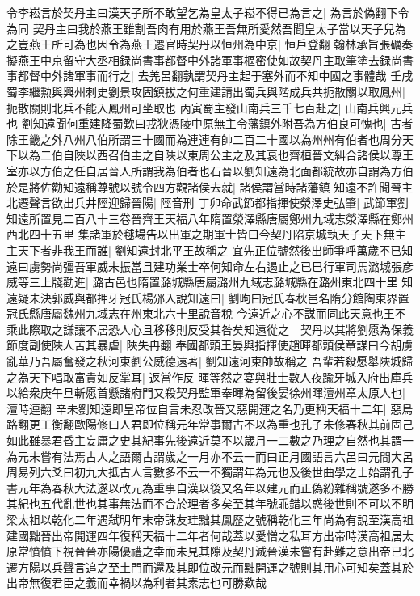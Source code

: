 令李崧言於契丹主曰漢天子所不敢望乞為皇太子崧不得已為言之|{
	為言於偽翻下令為同}
契丹主曰我於燕王雖割吾肉有用於燕王吾無所愛然吾聞皇太子當以天子兒為之豈燕王所可為也因令為燕王遷官時契丹以恒州為中京|{
	恒戶登翻}
翰林承旨張礪奏擬燕王中京留守大丞相録尚書事都督中外諸軍事樞密使如故契丹主取筆塗去録尚書事都督中外諸軍事而行之|{
	去羌呂翻孰謂契丹主起于塞外而不知中國之事體哉}
壬戌蜀李繼勲與興州刺史劉景攻固鎮拔之何重建請出蜀兵與階成兵共扼散關以取鳳州|{
	扼散關則北兵不能入鳳州可坐取也}
丙寅蜀主發山南兵三千七百赴之|{
	山南兵興元兵也}
劉知遠聞何重建降蜀歎曰戎狄憑陵中原無主令藩鎮外附吾為方伯良可愧也|{
	古者除王畿之外八州八伯所謂三十國而為連連有帥二百二十國以為州州有伯者也周分天下以為二伯自陜以西召伯主之自陜以東周公主之及其衰也齊桓晉文糾合諸侯以尊王室亦以方伯之任自居晉人所謂我為伯者也石晉以劉知遠為北面都統故亦自謂為方伯}
於是將佐勸知遠稱尊號以號令四方觀諸侯去就|{
	諸侯謂當時諸藩鎮}
知遠不許聞晉主北遷聲言欲出兵井陘迎歸晉陽|{
	陘音刑}
丁卯命武節都指揮使滎澤史弘肇|{
	武節軍劉知遠所置見二百八十三卷晉齊王天福八年隋置滎澤縣唐屬鄭州九域志滎澤縣在鄭州西北四十五里}
集諸軍於毬場告以出軍之期軍士皆曰今契丹陷京城執天子天下無主主天下者非我王而誰|{
	劉知遠封北平王故稱之}
宜先正位號然後出師爭呼萬歲不已知遠曰虜勢尚彊吾軍威未振當且建功業士卒何知命左右遏止之已巳行軍司馬潞城張彦威等三上牋勸進|{
	潞古邑也隋置潞城縣唐屬潞州九域志潞城縣在潞州東北四十里}
知遠疑未決郭威與都押牙冠氏楊邠入說知遠曰|{
	劉昫曰冠氏春秋邑名隋分館陶東界置冠氏縣唐屬魏州九域志在州東北六十里說音稅}
今遠近之心不謀而同此天意也王不乘此際取之謙讓不居恐人心且移移則反受其咎矣知遠從之　契丹以其將劉愿為保義節度副使陜人苦其暴虐|{
	陜失冉翻}
奉國都頭王晏與指揮使趙暉都頭侯章謀曰今胡虜亂華乃吾屬奮發之秋河東劉公威德遠著|{
	劉知遠河東帥故稱之}
吾輩若殺愿舉陜城歸之為天下唱取富貴如反掌耳|{
	返當作反}
暉等然之宴與壯士數人夜踰牙城入府出庫兵以給衆庚午旦斬愿首懸諸府門又殺契丹監軍奉暉為留後晏徐州暉澶州章太原人也|{
	澶時連翻}
辛未劉知遠即皇帝位自言未忍改晉又惡開運之名乃更稱天福十二年|{
	惡烏路翻更工衡翻歐陽修曰人君即位稱元年常事爾古不以為重也孔子未修春秋其前固己如此雖暴君昏主妄庸之史其紀事先後遠近莫不以歲月一二數之乃理之自然也其謂一為元未嘗有法焉古人之語爾古謂歲之一月亦不云一而曰正月國語言六呂曰元間大呂周易列六爻曰初九大抵古人言數多不云一不獨謂年為元也及後世曲學之士始謂孔子書元年為春秋大法遂以改元為重事自漢以後又名年以建元而正偽紛雜稱號遂多不勝其紀也五代亂世也其事無法而不合於理者多矣至其年號乖錯以惑後世則不可以不明梁太祖以乾化二年遇弑明年末帝誅友珪黜其鳳歷之號稱乾化三年尚為有說至漢高祖建國黜晉出帝開運四年復稱天福十二年者何哉蓋以愛憎之私耳方出帝時漢高祖居太原常憤憤下視晉晉亦陽優禮之幸而未見其隙及契丹滅晉漢未嘗有赴難之意出帝已北遷方陽以兵聲言追之至土門而還及其即位改元而黜開運之號則其用心可知矣蓋其於出帝無復君臣之義而幸禍以為利者其素志也可勝歎哉}
